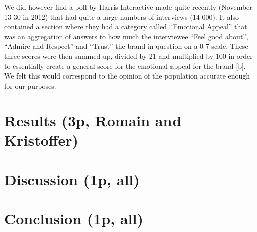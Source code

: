 \documentclass[a4paper,11pt]{report}
\begin{document}
We did however find a poll by Harris Interactive made quite recently (November 13-30 in 2012) that had quite a large numbers of interviews (14 000). 
It also contained a section where they had a category called “Emotional Appeal” that was an aggregation of answers to how much the interviewee “Feel good about”, “Admire and Respect” and “Trust” the brand in question on a 0-7 scale. 
These three scores were then summed up, divided by 21 and multiplied by 100 in order to essentially create a general score for the emotional appeal for the brand [b]. 
We felt this would correspond to the opinion of the population accurate enough for our purposes.

\chapter{Results (3p, Romain and Kristoffer)}

\chapter{Discussion (1p, all)}

\chapter{Conclusion (1p, all)}
\end{document}
